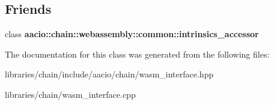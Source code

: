 \subsection*{Friends}
\begin{DoxyCompactItemize}
\item 
\mbox{\label{classaacio_1_1chain_1_1wasm__interface_a347322cd22db1209f3f4e4ff68891308}} 
class {\bfseries aacio\+::chain\+::webassembly\+::common\+::intrinsics\+\_\+accessor}
\end{DoxyCompactItemize}


The documentation for this class was generated from the following files\+:\begin{DoxyCompactItemize}
\item 
libraries/chain/include/aacio/chain/wasm\+\_\+interface.\+hpp\item 
libraries/chain/wasm\+\_\+interface.\+cpp\end{DoxyCompactItemize}
